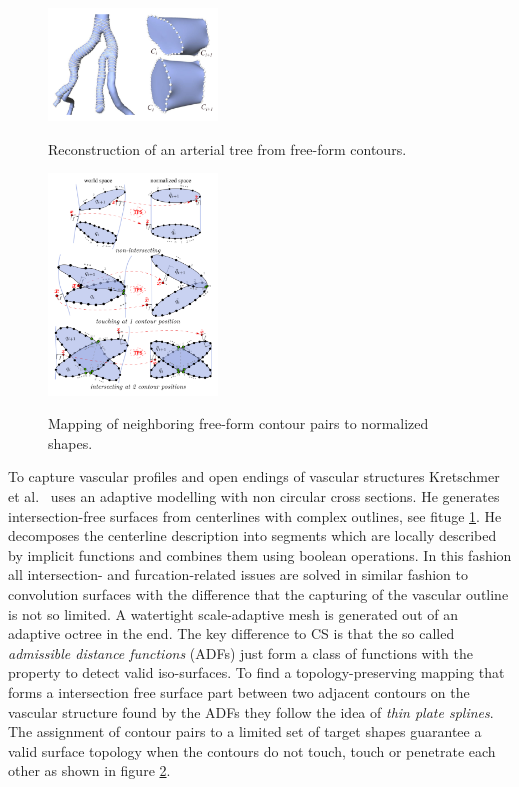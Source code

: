 \begin{figure}[h]
	\centering
	\includegraphics[width=0.4\textwidth]{./Images/ReconstructionFreeFormContours.png} \\
	\caption{Reconstruction of an arterial tree from free-form contours.}
	\cite{kretschmer2012reliable}
	\label{fig:ReconstructionFreeFormContours}
\end{figure} 

\begin{figure}[h]
	\centering
	\includegraphics[width=0.4\textwidth]{./Images/IntersectingContours.png} \\
	\caption{Mapping of neighboring free-form contour pairs to normalized shapes.}
	\cite{kretschmer2012reliable}
	\label{fig:IntersectingContours}
\end{figure} 

To capture vascular profiles and open endings of vascular structures Kretschmer et al.~\cite{kretschmer2012reliable} uses an adaptive modelling with non circular cross sections. He generates intersection-free surfaces from centerlines with complex outlines, see fituge \ref{fig:ReconstructionFreeFormContours}. He decomposes the centerline description into segments which are locally described by implicit functions and combines them using boolean operations. In this fashion all intersection- and furcation-related issues are solved in similar fashion to convolution surfaces with the difference that the capturing of the vascular outline is not so limited. A watertight scale-adaptive mesh is generated out of an adaptive octree in the end. The key difference to CS is that the so called \emph{admissible distance functions} (ADFs) just form a class of functions with the property to detect valid iso-surfaces. To find a topology-preserving mapping that forms a intersection free surface part between two adjacent contours on the vascular structure found by the ADFs they follow the idea of \emph{thin plate splines}. The assignment of contour pairs to a limited set of target shapes guarantee a valid surface topology when the contours do not touch, touch or penetrate each other as shown in figure \ref{fig:IntersectingContours}.

